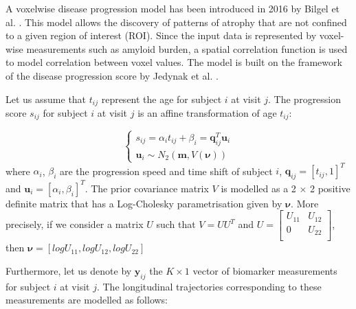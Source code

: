A voxelwise disease progression model has been introduced in 2016 by Bilgel et al. \cite{bilgel2016multivariate}. This model allows the discovery of patterns of atrophy that are not confined to a given region of interest (ROI). Since the input data is represented by voxel-wise measurements such as amyloid burden, a spatial correlation function is used to model correlation between voxel values. The model is built on the framework of the disease progression score by Jedynak et al. \cite{jedynak2012computational}. 

Let us assume that $t_{ij}$ represent the age for subject $i$ at visit $j$. The progression score $s_{ij}$ for subject $i$ at visit $j$ is an affine transformation of age $t_{ij}$:

\begin{equation}
 \begin{cases}
 s_{ij} = \alpha_i t_{ij} + \beta_i = \textbf{q}_{ij}^T\textbf{u}_i\\
 \textbf{u}_i \sim N_2(\textbf{m}, V(\boldsymbol{\nu}))
\end{cases}
\end{equation}
where $\alpha_i$, $\beta_i$ are the progression speed and time shift of subject $i$, $\textbf{q}_{ij} = [t_{ij}, 1]^T$ and $\textbf{u}_{i} = [\alpha_i, \beta_i]^T$. The prior covariance matrix $V$ is modelled as a 2 $\times$ 2 positive definite matrix that has a Log-Cholesky parametrisation given by $\boldsymbol{\nu}$. More precisely, if we consider a matrix $U$ such that $V = UU^T$ and $U = \begin{bmatrix}
    U_{11} & U_{12} \\
    0 & U_{22}\\
\end{bmatrix}$, then $\boldsymbol{\nu} = [logU_{11}, logU_{12}, logU_{22}]$

Furthermore, let us denote by $\textbf{y}_{ij}$ the $K \times 1$ vector of biomarker measurements for subject $i$ at visit $j$. The longitudinal trajectories corresponding to these measurements are modelled as follows:

